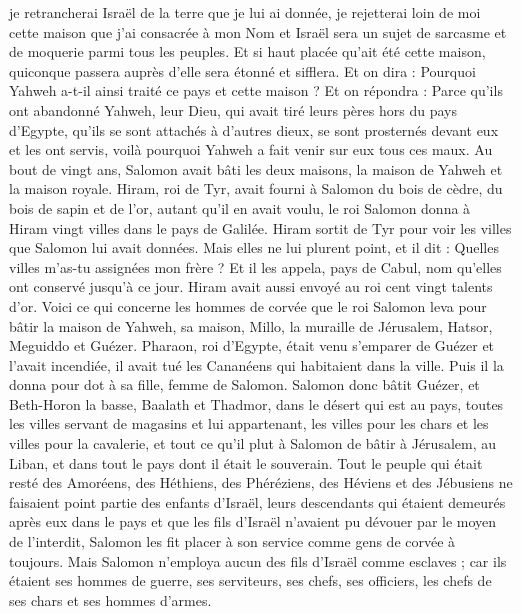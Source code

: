 \begin{multicols}{2}
je retrancherai Israël de la terre que je lui ai donnée, je rejetterai loin de moi cette maison que j'ai consacrée à mon Nom et Israël sera un sujet de sarcasme et de moquerie parmi tous les peuples.
Et si haut placée qu'ait été cette maison, quiconque passera auprès d'elle sera étonné et sifflera. Et on dira : Pourquoi Yahweh a-t-il ainsi traité ce pays et cette maison ?
Et on répondra : Parce qu'ils ont abandonné Yahweh, leur Dieu, qui avait tiré leurs pères hors du pays d'Egypte, qu'ils se sont attachés à d'autres dieux, se sont prosternés devant eux et les ont servis, voilà pourquoi Yahweh a fait venir sur eux tous ces maux.
Au bout de vingt ans, Salomon avait bâti les deux maisons, la maison de Yahweh et la maison royale.
Hiram, roi de Tyr, avait fourni à Salomon du bois de cèdre, du bois de sapin et de l'or, autant qu'il en avait voulu, le roi Salomon donna à Hiram vingt villes dans le pays de Galilée.
Hiram sortit de Tyr pour voir les villes que Salomon lui avait données. Mais elles ne lui plurent point,
et il dit : Quelles villes m'as-tu assignées mon frère ? Et il les appela, pays de Cabul, nom qu'elles ont conservé jusqu'à ce jour.
Hiram avait aussi envoyé au roi cent vingt talents d'or.
Voici ce qui concerne les hommes de corvée que le roi Salomon leva pour bâtir la maison de Yahweh, sa maison, Millo, la muraille de Jérusalem, Hatsor, Meguiddo et Guézer.
Pharaon, roi d'Egypte, était venu s'emparer de Guézer et l'avait incendiée, il avait tué les Cananéens qui habitaient dans la ville. Puis il la donna pour dot à sa fille, femme de Salomon.
Salomon donc bâtit Guézer, et Beth-Horon la basse,
Baalath et Thadmor, dans le désert qui est au pays,
toutes les villes servant de magasins et lui appartenant, les villes pour les chars et les villes pour la cavalerie, et tout ce qu'il plut à Salomon de bâtir à Jérusalem, au Liban, et dans tout le pays dont il était le souverain.
Tout le peuple qui était resté des Amoréens, des Héthiens, des Phéréziens, des Héviens et des Jébusiens ne faisaient point partie des enfants d'Israël,
leurs descendants qui étaient demeurés après eux dans le pays et que les fils d'Israël n'avaient pu dévouer par le moyen de l'interdit, Salomon les fit placer à son service comme gens de corvée à toujours.
Mais Salomon n'employa aucun des fils d'Israël comme esclaves ; car ils étaient ses hommes de guerre, ses serviteurs, ses chefs, ses officiers, les chefs de ses chars et ses hommes d'armes.

\end{multicols}
